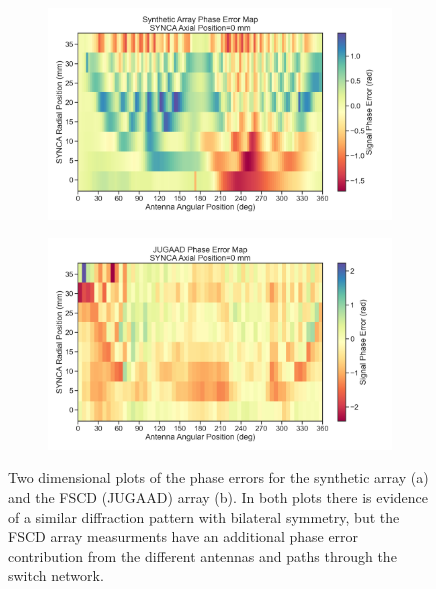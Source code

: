 \begin{figure}[h]
\centering
\begin{subfigure}{.7\textwidth}
  \centering
  \includegraphics[width=1\textwidth]{figs/Chapter-5/230120_synth_array_phase_error_map_z0.png}
  \caption{}
  \label{fig:jugaad_phase_map}
\end{subfigure}
\par\medskip %
\begin{subfigure}{.7\textwidth}
  \centering
  \includegraphics[width=1\textwidth]{figs/Chapter-5/230123_jugaad_phase_error_map_z0.png}
  \caption{}
  \label{fig:synth_jugaad_phase_map}
\end{subfigure}
\caption{Two dimensional plots of the phase errors for the synthetic array (a) and the FSCD (JUGAAD) array (b). In both plots there is evidence of a similar diffraction pattern with bilateral symmetry, but the FSCD array measurments have an additional phase error contribution from the different antennas and paths through the switch network.}
\label{fig:jugaad_measured_phase_maps}
\end{figure}


